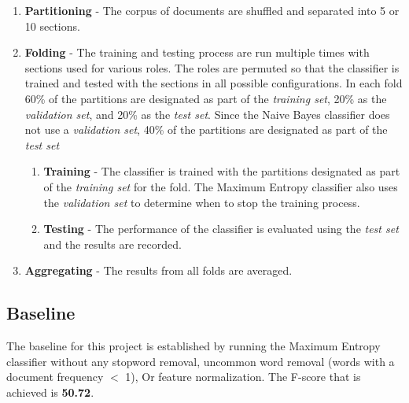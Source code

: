 \documentclass[final,3p,12pt]{elsarticle}
\begin{document}
        \begin{enumerate}

        \item \textbf{Partitioning} - The corpus of documents are shuffled and
            separated into 5 or 10 sections.

        \item \textbf{Folding} - The training and testing process are run
            multiple times with sections used for various roles. The roles are
            permuted so that the classifier is trained and tested with the
            sections in all possible configurations. In each fold 60\% of the
            partitions are designated as part of the \textit{training set},
            20\% as the \textit{validation set}, and 20\% as the \textit{test set}.
            Since the Naive Bayes classifier does not use a \textit{validation set},
            40\% of the partitions are designated as part of the
            \textit{test set}


        \begin{enumerate}

            \item \textbf{Training} - The classifier is trained with the
                partitions designated as part of the \textit{training set} for
                the fold. The Maximum Entropy classifier also uses the
                \textit{validation set} to determine when to stop the training
                process.

            \item \textbf{Testing} - The performance of the classifier is
                evaluated using the \textit{test set} and the results are recorded.

        \end{enumerate}

        \item \textbf{Aggregating} - The results from all folds are averaged.

        \end{enumerate}


\subsection{Baseline}
\label{ssection:baseline}

The baseline for this project is established by running the Maximum Entropy
classifier without any stopword removal, uncommon word removal (words with a
document frequency $<$ 1), Or feature normalization. The F-score that is
achieved is \textbf{50.72}.
\end{document}
